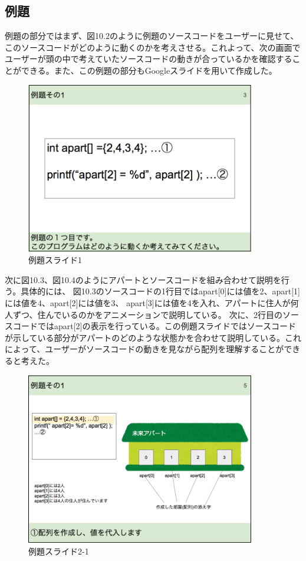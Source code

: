 \documentclass[openany,11pt,papersize]{jsbook}
\begin{document}
\subsection{例題}
例題の部分ではまず、図10.2のように例題のソースコードをユーザーに見せて、このソースコードがどのように動くのかを考えさせる。これよって、次の画面でユーザーが頭の中で考えていたソースコードの動きが合っているかを確認することができる。また、この例題の部分もGoogleスライドを用いて作成した。


\begin{figure}[H]
\begin{center}
\includegraphics[width=10cm, bb=0 0 852 638]{img/10thParagraph/reidai_01.png}
\end{center}
\caption{例題スライド1}
\end{figure}

次に図10.3、図10.4のようにアパートとソースコードを組み合わせて説明を行う。具体的には、
図10.3のソースコードの1行目ではapart[0]には値を2、apart[1]には値を4、apart[2]には値を3、
apart[3]には値を4を入れ、アパートに住人が何人ずつ、住んでいるのかをアニメーションで説明している。
次に、2行目のソースコードではapart[2]の表示を行っている。この例題スライドではソースコードが示している部分がアパートのどのような状態かを合わせて説明している。これによって、ユーザーがソースコードの動きを見ながら配列を理解することができると考えた。


\begin{figure}[H]
\begin{center}
\includegraphics[width=10cm, bb=0 0 850 640]{img/10thParagraph/reidai_02.png}
\end{center}
\caption{例題スライド2-1}
\end{figure}
\end{document}
